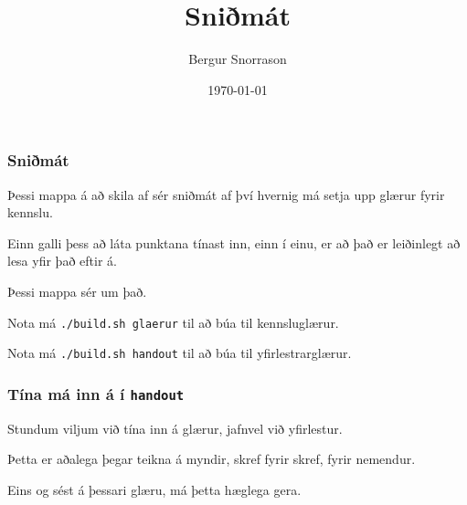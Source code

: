 \title{Sniðmát}
\author{Bergur Snorrason}
\date{\today}



\frame{\titlepage}

{
	\frametitle{Sniðmát}
	{
		\item<1-> Þessi mappa á að skila af sér sniðmát af því hvernig má setja upp glærur fyrir kennslu.
		\item<2-> Einn galli þess að láta punktana tínast inn, einn í einu, er að það er leiðinlegt að lesa yfir það eftir á.
		\item<3-> Þessi mappa sér um það.
		\item<4-> Nota má \texttt{./build.sh glaerur} til að búa til kennsluglærur.
		\item<5-> Nota má \texttt{./build.sh handout} til að búa til yfirlestrarglærur.
	}
}

{
	\frametitle{Tína má inn á í \texttt{handout}}
	{
		\item<all:1-> Stundum viljum við tína inn á glærur, jafnvel við yfirlestur.
		\item<all:2-> Þetta er aðalega þegar teikna á myndir, skref fyrir skref, fyrir nemendur.
		\item<all:3-> Eins og sést á þessari glæru, má þetta hæglega gera.
	}
}


